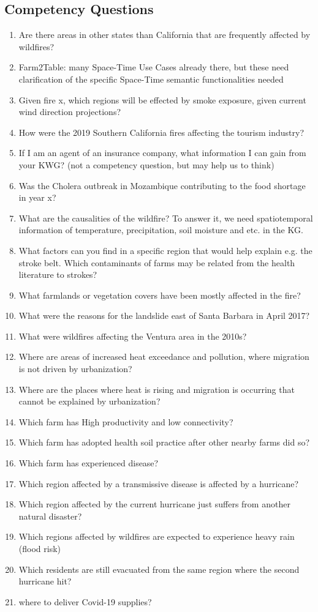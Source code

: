 \subsection{Competency Questions}
\label{ssec:cqs}
\begin{enumerate}[\phantom{CQ }CQ 1.]
	\item Are there areas in other states than California that are frequently affected by wildfires?
	\item Farm2Table:  many Space-Time Use Cases already there, but these need clarification of the specific Space-Time semantic functionalities needed
	\item Given fire x, which regions will be effected by smoke exposure, given current wind direction projections?
	\item How were the 2019 Southern California fires affecting the tourism industry?
	\item If I am an agent of an insurance company, what information I can gain from your KWG? (not a competency question, but may help us to think)
	\item Was the Cholera outbreak in Mozambique contributing to the food shortage in year x?
	\item What are the causalities of the wildfire? To answer it, we need spatiotemporal information of temperature, precipitation, soil moisture and etc. in the KG.
	\item What factors can you find in a specific region that would help explain e.g. the stroke belt. Which contaminants of farms may be related from the health literature to strokes?
	\item What farmlands or vegetation covers have been mostly affected in the fire?
	\item What were the reasons for the landslide east of Santa Barbara in April 2017?
	\item What were wildfires affecting the Ventura area in the 2010s?
	\item Where are areas of increased heat exceedance and pollution, where migration is not driven by urbanization?
	\item Where are the places where heat is rising and migration is occurring that cannot be explained by urbanization?
	\item Which farm has High productivity and low connectivity?
	\item Which farm has adopted health soil practice after other nearby farms did so?
	\item Which farm has experienced disease?
	\item Which region affected by a transmissive disease is affected by a hurricane?
	\item Which region affected by the current hurricane just suffers from another natural disaster?
	\item Which regions affected by wildfires are expected to experience heavy rain (flood risk)
	\item Which residents are still evacuated from the same region where the second hurricane hit?
	\item where to deliver Covid-19 supplies?
\end{enumerate}

